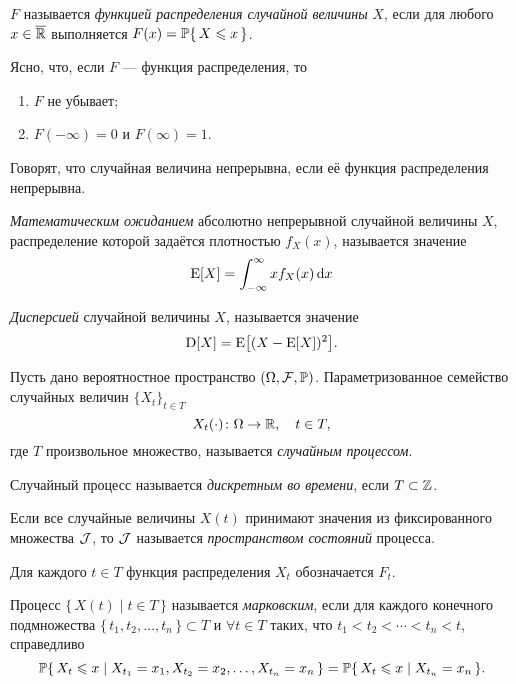 \begin{define}
	$F$ называется \emph{функцией распределения случайной величины} $X$, если для любого $x \in \exR$ выполняется $F(x) = \P\{\, X \leqslant x \,\}$.
\end{define}
Ясно, что, если $F$ --- функция распределения, то
\begin{enumerate}
	\item $F$ не убывает;
	\item $F(-\infty) = 0$ и $F(\infty) = 1$.
\end{enumerate}

Говорят, что случайная величина непрерывна, если её функция распределения непрерывна.

\begin{define}
    \emph{Математическим ожиданием} абсолютно непрерывной случайной величины $X$, распределение которой задаётся плотностью $f_X(x)$, называется значение
\[
    \E[X] = \int_{-\infty}^{\infty} x f_X(x)\, \d x
\]
\end{define}

\begin{define}
    \emph{Дисперсией} случайной величины $X$, называется значение
\[
    \D[X] = \E\sqts*{(X - \E[X])^2}.
\]
\end{define}

\begin{define}
	Пусть дано вероятностное пространство $(\Omega, \mathcal{F},\P)$. Параметризованное семейство случайных величин $\{X_t\}_{t \in T}$
\[
	X_t(\cdot) \colon \Omega \to \R, \quad t \in T,
\]
где $T$ произвольное множество, называется \emph{случайным процессом}.
\end{define}

\begin{define}
	Случайный процесс называется \emph{дискретным во времени}, если $T \subset \Z$.
\end{define}
\begin{define}
 	Если все случайные величины $X(t)$ принимают значения из фиксированного множества $\J$, то $\J$ называется \emph{пространством состояний} процесса.
\end{define}
Для каждого $t \in T$ функция распределения $X_t$ обозначается $F_t$.
\begin{define}
	Процесс $\{\, X(t) \mid t \in T \,\}$ называется \emph{марковским}, если для каждого конечного подмножества $\{\, t_1, t_2, \ldots, t_n \,\} \subset T$ и $\forall t \in T$ таких, что $t_1 < t_2 < \cdots < t_n < t$, справедливо
\[
\P\{\, X_t \leqslant x \mid X_{t_1} = x_1, X_{t_2} = x_2, \ldots, X_{t_n} = x_n \,\} = \P\{\, X_t \leqslant x \mid X_{t_n} = x_n \,\}.
\]
\end{define}

